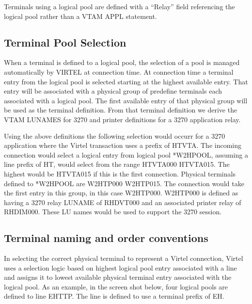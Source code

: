 \documentclass[letterpaper,10pt,english]{sphinxmanual}
\begin{document}
\sphinxAtStartPar
{}

\sphinxAtStartPar
Terminals using a logical pool are defined with a “Relay” field referencing the logical pool rather than a VTAM APPL statement.

\ignorespaces 

\subsection{Terminal Pool Selection}
\label{\detokenize{connectivity_guide:terminal-pool-selection}}\label{\detokenize{connectivity_guide:index-146}}
\sphinxAtStartPar
When a terminal is defined to a logical pool, the selection of a pool is managed automatically by VIRTEL at connection time. At connection time a terminal entry from the logical pool is selected starting at the highest available entry. That entry will be associated with a physical group of predefine terminals each associated with a logical pool. The first available entry of that physical group will be used as the terminal definition. From that terminal definition we derive the VTAM LUNAMES for 3270 and printer definitions for a 3270 application relay.

\sphinxAtStartPar
Using the above definitions the following selection would occurr for a 3270 application where the Virtel transaction uses a prefix of HTVTA. The incoming connection would select a logical entry from logical pool *W2HPOOL, assuming a line prefix of HT, would select from the range HTVTA000 \sphinxhyphen{} HTVTA015. The highest would be HTVTA015 if this is the first connection. Physical terminals defined to *W2HPOOL are W2HTP000 \sphinxhyphen{} W2HTP015. The connection would take the first entry in this group, in this case W2HTP000. W2HTP000 is defined as having a 3270 relay LUNAME of RHDVT000 and an associated printer relay of RHDIM000. These LU names would be used to support the 3270 session.


\subsection{Terminal naming and order conventions}
\label{\detokenize{connectivity_guide:terminal-naming-and-order-conventions}}
\sphinxAtStartPar
In selecting the correct physical terminal to represent a Virtel connection, Virtel uses a selection logic based on highest logical pool entry associated with a line and assigns it to lowest available physical terminal entry associated with the logical pool. As an example, in the screen shot below, four logical pools are defined to line E\sphinxhyphen{}HTTP. The line is defined to use a terminal prefix of EH.
\end{document}
